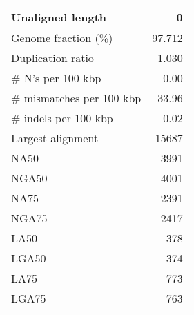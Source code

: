 \documentclass[12pt,a4paper]{article}
\begin{document}
\begin{table}[ht]
\begin{center}
\begin{tabular}{|l*{1}{|r}|}
Unaligned length & 0 \\ \hline
Genome fraction (\%) & 97.712 \\ \hline
Duplication ratio & 1.030 \\ \hline
\# N's per 100 kbp & 0.00 \\ \hline
\# mismatches per 100 kbp & 33.96 \\ \hline
\# indels per 100 kbp & 0.02 \\ \hline
Largest alignment & 15687 \\ \hline
NA50 & 3991 \\ \hline
NGA50 & 4001 \\ \hline
NA75 & 2391 \\ \hline
NGA75 & 2417 \\ \hline
LA50 & 378 \\ \hline
LGA50 & 374 \\ \hline
LA75 & 773 \\ \hline
LGA75 & 763 \\ \hline
\end{tabular}
\end{center}
\end{table}
\end{document}
